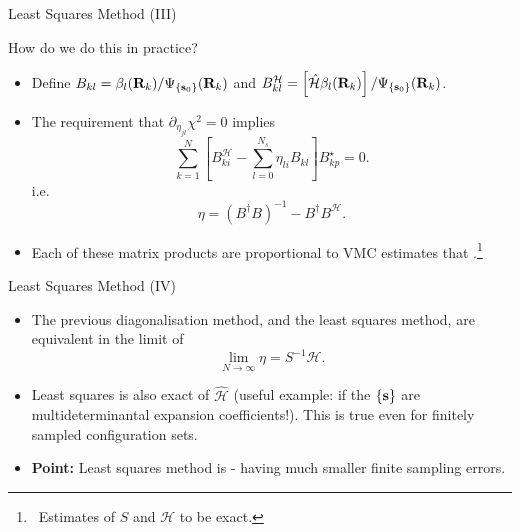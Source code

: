 \documentclass[12pt, pdf, hyperref={draft}, usenames, dvipsnames,
aspectratio=169]{beamer}
\newcommand{\blue}[1]{{\bf\color{NavyBlue}{#1}}}
\newcommand{\green}[1]{{\bf\color{ForestGreen}{#1}}}
\begin{document}
\begin{frame}{Least Squares Method (III)}
\begin{block}{How do we do this in practice?}
\begin{itemize}
  \item Define $B_{kl} = \beta_{l}({\bf R}_k) / \Psi_{\{{\bf s}_0\}}({\bf
  R}_k)$ and $B^{\mathcal{H}}_{kl} = \left[ \mathcal{\hat H}\beta_{l}({\bf
  R}_k) \right] / \Psi_{\{{\bf s}_0\}}({\bf R}_k)$.
  \item The requirement that $\partial_{\eta_{jl}} \chi^2 = 0$ implies
  \begin{equation}
    \sum^{N}_{k=1} \left[ B^{\mathcal{H}}_{ki} - \sum^{N_s}_{l=0}
    \eta_{li}B_{kl} \right] B^{\star}_{kp} = 0.
  \end{equation}
  i.e.\
  \begin{equation}
    \eta = {(B^{\dagger}B)}^{-1} - B^{\dagger}B^{\mathcal{H}}.
  \end{equation}
  \item Each of these matrix products are proportional to VMC estimates that
  \green{are known}.\footnote{\ Estimates of $S$ and $\mathcal{H}$ to be exact.}
\end{itemize}
\end{block}
\end{frame}


\begin{frame}{Least Squares Method (IV)}
\begin{itemize}
  \item The previous diagonalisation method, and the least squares method, are
  equivalent in the limit of \blue{infinite sampling}
  \begin{equation}
    \lim_{N \rightarrow \infty} \eta = S^{-1}\mathcal{H}.
  \end{equation}
  \item Least squares is also exact \blue{if basis functions span an invariant
  subspace} of $\mathcal{\hat H}$ (useful example: if the $\{ {\bf s} \}$ are
  multideterminantal expansion coefficients!). This is true even for finitely
  sampled configuration sets.
  \item \textbf{Point: } Least squares method is \green{usually better} - having much
  smaller finite sampling errors.
\end{itemize}
\end{frame}
\end{document}

